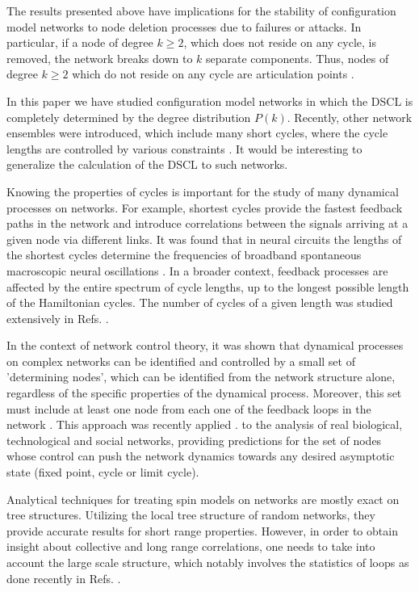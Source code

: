 \documentclass[preprint,pre,superscriptaddress,showpacs]{revtex4}
\begin{document}
The results presented above have implications for the stability of configuration
model networks to node deletion processes due to failures or attacks.
In particular, if a node of degree $k \ge 2$, which does not reside on any cycle,
is removed, the network breaks down to $k$ separate components. 
Thus, nodes of degree $k \ge 2$ which do not reside on any cycle are
articulation points
\cite{Tian2017}.

In this paper we have studied configuration model networks in
which the DSCL is completely determined by the degree distribution
$P(k)$. Recently, other network ensembles were introduced, which
include many short cycles, where the cycle lengths are controlled by
various constraints
\cite{Roberts2014,Coolen2016}.
It would be interesting to generalize the calculation of the 
DSCL to such networks.

Knowing the properties of cycles is important for the study of
many dynamical processes on networks.
For example, shortest cycles provide the fastest 
feedback paths in the network
and introduce correlations between the signals arriving
at a given node via different links.
It was found that in neural circuits the lengths of the shortest 
cycles determine the frequencies 
of broadband spontaneous macroscopic neural oscillations
\cite{Vladimirov2012,Goldental2015,Goldental2017}.
In a broader context, feedback processes are affected by the
entire spectrum of cycle lengths, up to the longest possible
length of the Hamiltonian cycles.
The number of cycles of a given length was studied extensively
in Refs. 
\cite{Marinari2004,Bianconi2005,Marinari2006a,Marinari2006b,Klemm2006,Noh2008}.

In the context of network control theory, it was shown that
dynamical processes on complex networks can be identified and
controlled by a small set of 'determining nodes', which can be
identified from the network structure alone, regardless of the
specific properties of the dynamical process.
Moreover, this set must include at least one node from each
one of the feedback loops in the network
\cite{Fiedler2013,Mochizuki2013}.
This approach was recently applied
\cite{Zanudo2017}.
to the analysis of real biological,
technological and social networks, providing predictions for the set
of nodes whose control can push the network dynamics towards any
desired asymptotic state (fixed point, cycle or limit cycle).


Analytical techniques for treating spin models on networks
are mostly exact on tree structures. Utilizing the local tree
structure of random networks, they provide accurate results
for short range properties. However, in order to obtain insight
about collective and long range correlations, one needs to 
take into account the large scale structure, which notably
involves the statistics of loops
as done recently in Refs.
\cite{Montanari2005,Altieri2017}.
\end{document}
